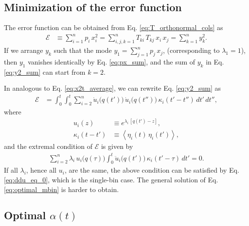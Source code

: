 \documentclass[reprint]{revtex4-1}
\begin{document}
\subsection{Minimization of the error function}



The error function can be obtained
from Eq. \eqref{eq:T_orthonormal_cols}
as
\begin{align}
  \mathcal E
  &\equiv
  \sum_{i = 1}^n p_i \, x_i^2
  =
  \sum_{i, j, k=1}^n T_{ki} \, T_{kj} \, x_i \, x_j
  =
  \sum_{k = 1}^n y_k^2.
  \label{eq:y2_sum}
\end{align}
%
If we arrange $y_k$ such that
the mode $y_1 = \sum_{j=1}^n p_j \, x_j$,
(corresponding to $\lambda_1 = 1$),
then $y_1$ vanishes identically
by Eq. \eqref{eq:px_sum},
and the sum of $y_k$ in Eq. \eqref{eq:y2_sum}
can start from $k = 2$.



In analogous to Eq. \eqref{eq:x2t_average},
we can rewrite Eq. \eqref{eq:y2_sum} as
%
\begin{align}
  \mathcal E
  &=
  \int_0^t \int_0^t
  \sum_{i = 2}^n
  \dot u_i\bigl( q(t') \bigr) \,
  \dot u_i\bigl( q(t'') \bigr) \,
  \kappa_i(t' - t'') \, dt' \, dt'',
  \label{eq:error_mbin}
\end{align}
%
where
\begin{align*}
  u_i(z)
  &\equiv
  e^{\lambda_i \, [q(t') - z]},
  \\
  \kappa_i(t - t')
  &\equiv
  \left\langle
    \eta_i(t) \, \eta_i(t')
  \right\rangle,
\end{align*}
%
and the extremal condition of $\mathcal E$ is given by
%
\begin{align}
\sum_{i=2}^n
\lambda_i \, u_i\bigl( q(\tau) \bigr)
\int_0^t
\ddot u_i\bigl( q(t') \bigr) \, \kappa_i(t' - \tau) \, dt' = 0.
\label{eq:optimal_mbin}
\end{align}
%
If all $\lambda_i$, hence all $u_i$, are the same,
the above condition can be satisfied
by Eq. \eqref{eq:ddu_eq_0},
which is the single-bin case.
%
The general solution of Eq. \eqref{eq:optimal_mbin}
is harder to obtain.



\subsection{Optimal $\alpha(t)$}
\end{document}
